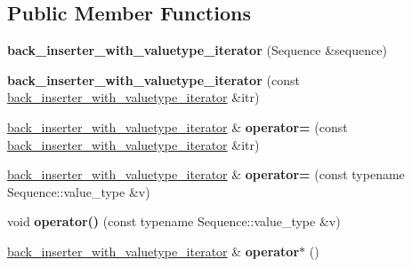 \subsection*{Public Member Functions}
\begin{DoxyCompactItemize}
\item 
\hypertarget{classstrtk_1_1back__inserter__with__valuetype__iterator_a89e3a774ea83fb93775542b6255b1905}{{\bfseries back\-\_\-inserter\-\_\-with\-\_\-valuetype\-\_\-iterator} (Sequence \&sequence)}\label{classstrtk_1_1back__inserter__with__valuetype__iterator_a89e3a774ea83fb93775542b6255b1905}

\item 
\hypertarget{classstrtk_1_1back__inserter__with__valuetype__iterator_a84959fff2894d224f1dae1e5214fcd47}{{\bfseries back\-\_\-inserter\-\_\-with\-\_\-valuetype\-\_\-iterator} (const \hyperlink{classstrtk_1_1back__inserter__with__valuetype__iterator}{back\-\_\-inserter\-\_\-with\-\_\-valuetype\-\_\-iterator} \&itr)}\label{classstrtk_1_1back__inserter__with__valuetype__iterator_a84959fff2894d224f1dae1e5214fcd47}

\item 
\hypertarget{classstrtk_1_1back__inserter__with__valuetype__iterator_a159a36d5ec6bf8b881d568b92f12e9dd}{\hyperlink{classstrtk_1_1back__inserter__with__valuetype__iterator}{back\-\_\-inserter\-\_\-with\-\_\-valuetype\-\_\-iterator} \& {\bfseries operator=} (const \hyperlink{classstrtk_1_1back__inserter__with__valuetype__iterator}{back\-\_\-inserter\-\_\-with\-\_\-valuetype\-\_\-iterator} \&itr)}\label{classstrtk_1_1back__inserter__with__valuetype__iterator_a159a36d5ec6bf8b881d568b92f12e9dd}

\item 
\hypertarget{classstrtk_1_1back__inserter__with__valuetype__iterator_a40c5805ab58a1d2718d9f14bddfeeb69}{\hyperlink{classstrtk_1_1back__inserter__with__valuetype__iterator}{back\-\_\-inserter\-\_\-with\-\_\-valuetype\-\_\-iterator} \& {\bfseries operator=} (const typename Sequence\-::value\-\_\-type \&v)}\label{classstrtk_1_1back__inserter__with__valuetype__iterator_a40c5805ab58a1d2718d9f14bddfeeb69}

\item 
\hypertarget{classstrtk_1_1back__inserter__with__valuetype__iterator_a639cd47c59f1c6a8c7918bb68aa52d4c}{void {\bfseries operator()} (const typename Sequence\-::value\-\_\-type \&v)}\label{classstrtk_1_1back__inserter__with__valuetype__iterator_a639cd47c59f1c6a8c7918bb68aa52d4c}

\item 
\hypertarget{classstrtk_1_1back__inserter__with__valuetype__iterator_a6e4a523e4982e9e80473ba93ebfcb59d}{\hyperlink{classstrtk_1_1back__inserter__with__valuetype__iterator}{back\-\_\-inserter\-\_\-with\-\_\-valuetype\-\_\-iterator} \& {\bfseries operator$\ast$} ()}\label{classstrtk_1_1back__inserter__with__valuetype__iterator_a6e4a523e4982e9e80473ba93ebfcb59d}


\end{DoxyCompactItemize}
